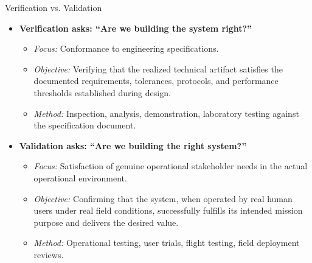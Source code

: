 \begin{definitionbox}{Verification vs. Validation}
\begin{itemize}[leftmargin=1.5em]
    \item \textbf{Verification asks: ``Are we building the system right?''}
    \begin{itemize}
        \item \textit{Focus:} Conformance to engineering specifications.
        \item \textit{Objective:} Verifying that the realized technical artifact satisfies the documented requirements, tolerances, protocols, and performance thresholds established during design.
        \item \textit{Method:} Inspection, analysis, demonstration, laboratory testing against the specification document.
    \end{itemize}
    \item \textbf{Validation asks: ``Are we building the right system?''}
    \begin{itemize}
        \item \textit{Focus:} Satisfaction of genuine operational stakeholder needs in the actual operational environment.
        \item \textit{Objective:} Confirming that the system, when operated by real human users under real field conditions, successfully fulfills its intended mission purpose and delivers the desired value.
        \item \textit{Method:} Operational testing, user trials, flight testing, field deployment reviews.
    \end{itemize}
\end{itemize}
\end{definitionbox}

